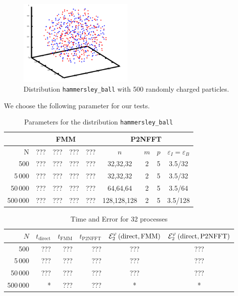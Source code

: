 \begin{figure}[ht]
  \centering
  \includegraphics[width=0.5\textwidth]{figures/hball_500}
  \caption{Distribution \texttt{hammersley\_{}ball} with 500 randomly charged particles.}
\end{figure}

We choose the following parameter for our tests.

\begin{table}[p]
  \begin{footnotesize}
    \begin{center}
      \begin{tabular}{|r||c|c|c|c||c|c|c|c|}
        \hline \rule{0cm}{2.5ex}
        & \multicolumn{4}{c|}{FMM} & \multicolumn{4}{c|}{P2NFFT} \\
        \hline \rule{0cm}{2.5ex}
        N & ??? & ??? & ??? & ??? & $n$ & $m$ & $p$ & $\varepsilon_{I} = \varepsilon_{B}$ \\
        \hline
        500      & ??? & ??? & ??? & ??? & 32,32,32 & 2 & 5 & 3.5/32 \\
        5\,000   & ??? & ??? & ??? & ??? & 32,32,32 & 2 & 5 & 3.5/32 \\
        50\,000  & ??? & ??? & ??? & ??? & 64,64,64 & 2 & 5 & 3.5/64 \\
        500\,000 & ??? & ??? & ??? & ??? & 128,128,128 & 2 & 5 & 3.5/128 \\
        \hline
      \end{tabular}
    \end{center}
  \end{footnotesize}
  \caption{Parameters for the distribution \texttt{hammersley\_{}ball}}
\end{table}


\begin{table}[p]
  \centering
  \begin{tabular}{|r||r|r|r||c|c|}
    \hline
    $N$ & $t_\textrm{direct}$ & $t_\textrm{FMM}$ & $t_\textrm{P2NFFT}$ &
    \rule{0cm}{3ex}
    ${\cal E}^{\varphi}_2\left(\textrm{direct},\textrm{FMM}\right)$ &
    ${\cal E}^{\varphi}_2\left(\textrm{direct},\textrm{P2NFFT}\right)$ \\
    \hline
    500 & ??? & ??? & ??? & ??? & ??? \\
    5\,000 & ??? & ??? & ??? & ??? & ??? \\
    50\,000 & ??? & ??? & ??? & ??? & ??? \\
    500\,000& * & ??? & ??? & * & * \\
    \hline
  \end{tabular}
  \caption{Time and Error for 32 processes}
\end{table}

